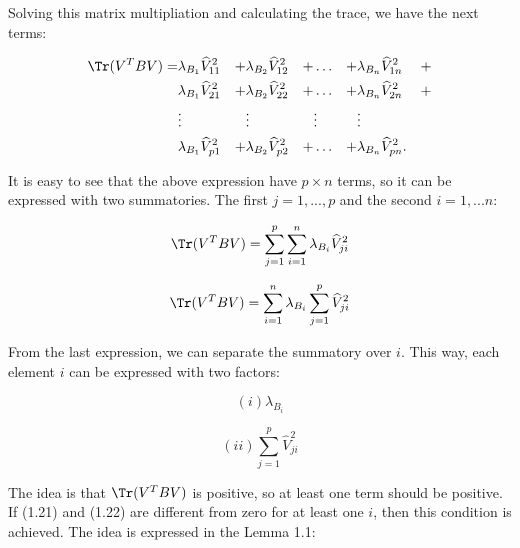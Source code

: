 Solving this matrix multipliation and calculating the trace, we have the next terms:

 \begin{equation*}
\begin{aligned}
      \Tr(V^T B V) =& \lambda_{B_1} \widehat{V}_{11}^2&  +
                     & \lambda_{B_2} \widehat{V}_{12}^2& +
                     & \hdots& +
                     &\lambda_{B_n} \widehat{V}_{1n}^2& + \\
                     & \lambda_{B_1} \widehat{V}_{21}^2&+
                     & \lambda_{B_2} \widehat{V}_{22}^2& +
                     & \hdots& +
                     &\lambda_{B_n} \widehat{V}_{2n}^2& + \\
                     & \vdots&  
                     & \vdots& 
                     & \vdots& 
                     & \vdots& \\
                     & \lambda_{B_1} \widehat{V}_{p1}^2&+
                     & \lambda_{B_2} \widehat{V}_{p2}^2& +
                     & \hdots& + 
                     & \lambda_{B_n} \widehat{V}_{pn}^2.&  
 \end{aligned}
 \end{equation*}

It is easy to see that the above expression have $p \times n$ terms, so it can be expressed with two summatories. The first $j=1,...,p$ and the second $i = 1,...n$:

\begin{equation*} 
\Tr(V^T B V) = \sum \limits_{j=1}^{p} \sum\limits_{i=1}^{n} \lambda_{B_i} \widehat{V}_{ji}^2
\end{equation*}

\begin{equation}\label{eq:2.21}
\Tr(V^T B V) = \sum\limits_{i=1}^{n} \lambda_{B_i} \sum \limits_{j=1}^{p} \widehat{V}_{ji}^2    
\end{equation}

From the last expression, we can separate the summatory over $i$. This way, each element $i$ can be expressed with two factors:

\begin{equation}\label{eq:2.22}
(i) \lambda_{B_i}
\end{equation}

 \begin{equation}\label{eq:2.23}
 (ii) \sum \limits_{j=1}^{p} \widehat{V}_{ji}^2   
 \end{equation}
 
The idea is that $\Tr(V^T B V)$ is positive, so at least one term should be positive. If (1.21) and (1.22) are different from zero for at least one $i$, then this condition is achieved. The idea is expressed in the Lemma 1.1:

